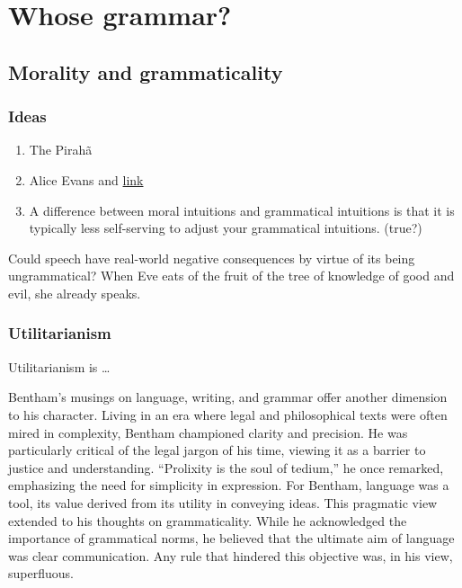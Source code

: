 \chapter{Whose grammar?}



\section{Morality and grammaticality}


\subsection{Ideas}
\begin{enumerate}
    \item The Pirahã
    \item Alice Evans and \href{https://www.youtube.com/watch?v=6gC8Mi_sOQU}{link}
    \item A difference between moral intuitions and grammatical intuitions is that it is typically less self-serving to adjust your grammatical intuitions. (true?)
\end{enumerate}

Could speech have real-world negative consequences by virtue of its being ungrammatical?
When Eve eats of the fruit of the tree of knowledge of good and evil, she already speaks.

\subsection{Utilitarianism}

Utilitarianism is \dots

Bentham's musings on language, writing, and grammar offer another dimension to his character. Living in an era where legal and philosophical texts were often mired in complexity, Bentham championed clarity and precision. He was particularly critical of the legal jargon of his time, viewing it as a barrier to justice and understanding. ``Prolixity is the soul of tedium,'' he once remarked, emphasizing the need for simplicity in expression. For Bentham, language was a tool, its value derived from its utility in conveying ideas. This pragmatic view extended to his thoughts on grammaticality. While he acknowledged the importance of grammatical norms, he believed that the ultimate aim of language was clear communication. Any rule that hindered this objective was, in his view, superfluous.

